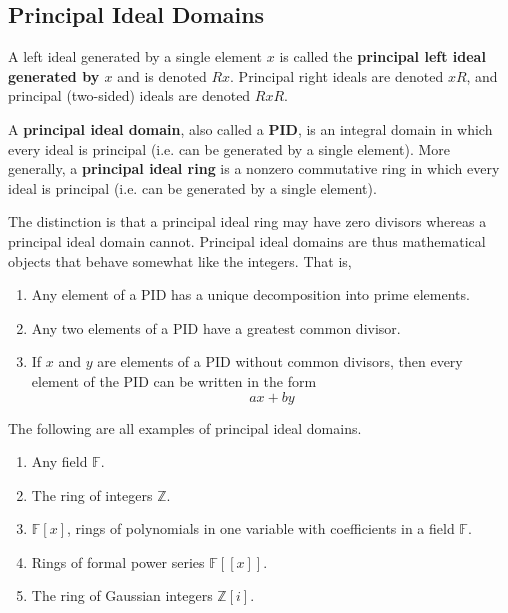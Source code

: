 \subsection{Principal Ideal Domains} 

  \begin{definition}
    A left ideal generated by a single element $x$ is called the \textbf{principal left ideal generated by $x$} and is denoted $R x$. Principal right ideals are denoted $x R$, and principal (two-sided) ideals are denoted $R x R$. 
  \end{definition}

  \begin{definition}
    A \textbf{principal ideal domain}, also called a \textbf{PID}, is an integral domain in which every ideal is principal (i.e. can be generated by a single element). More generally, a \textbf{principal ideal ring} is a nonzero commutative ring in which every ideal is principal (i.e. can be generated by a single element). 
  \end{definition}

  The distinction is that a principal ideal ring may have zero divisors whereas a principal ideal domain cannot. Principal ideal domains are thus mathematical objects that behave somewhat like the integers. That is, 
  \begin{enumerate}
    \item Any element of a PID has a unique decomposition into prime elements. 
    \item Any two elements of a PID have a greatest common divisor. 
    \item If $x$ and $y$ are elements of a PID without common divisors, then every element of the PID can be written in the form 
      \begin{equation}
        a x + b y
      \end{equation}
  \end{enumerate}

  \begin{example}
    The following are all examples of principal ideal domains. 
    \begin{enumerate}
      \item Any field $\mathbb{F}$. 
      \item The ring of integers $\mathbb{Z}$. 
      \item $\mathbb{F}[x]$, rings of polynomials in one variable with coefficients in a field $\mathbb{F}$. 
      \item Rings of formal power series $\mathbb{F}[[x]]$. 
      \item The ring of Gaussian integers $\mathbb{Z}[i]$. 
    \end{enumerate}
  \end{example}


